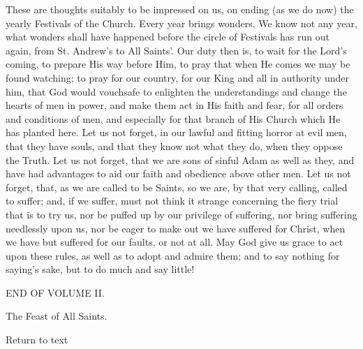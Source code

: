 These are thoughts suitably to be impressed on us, on ending (as we
do now) the yearly Festivals of the Church. Every year brings wonders.
We know not any year, what wonders shall have happened before the circle
of Festivals has run out again, from St. Andrew's to All Saints'. Our
duty then is, to wait for the Lord's coming, to prepare His way before
Him, to pray that when He comes we may be found watching; to pray for
our country, for our King and all in authority under him, that God would
vouchsafe to enlighten the understandings and change the hearts of men
in power, and make them act in His faith and fear, for all orders and
conditions of men, and especially for that branch of His Church which He
has planted here. Let us not forget, in our lawful and fitting horror at
evil men, that they have souls, and that they know not what they do,
when they oppose the Truth. Let us not forget, that we are sons of
sinful Adam as well as they, and have had advantages to aid our faith
and obedience above other men. Let us not forget, that, as we are called
to be Saints, so we are, by that very calling, called to suffer; and, if
we suffer, must not think it strange concerning the fiery trial that is
to try us, nor be puffed up by our privilege of suffering, nor bring
suffering needlessly upon us, nor be eager to make out we have suffered
for Christ, when we have but suffered for our faults, or not at all. May
God give us grace to act upon these rules, as well as to adopt and
admire them; and to say nothing for saying's sake, but to do much and
say little!

END OF VOLUME II.


The Feast of All Saints.

Return to text
